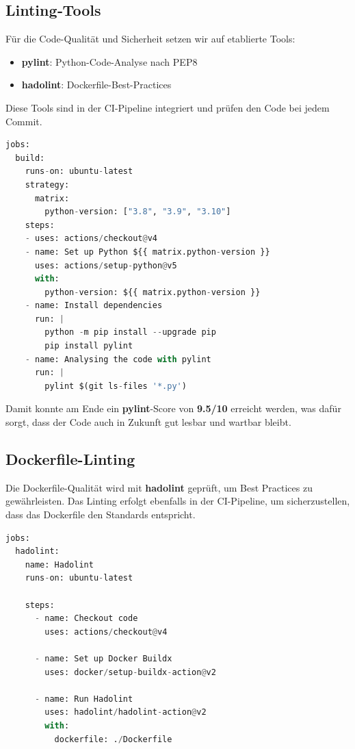 \documentclass{article}
\begin{document}
\newpage

\subsection{Linting‐Tools}

Für die Code-Qualität und Sicherheit setzen wir auf etablierte Tools:

\begin{itemize}
  \item \textbf{pylint}: Python-Code-Analyse nach PEP8
  \item \textbf{hadolint}: Dockerfile-Best-Practices
\end{itemize}

Diese Tools sind in der CI-Pipeline integriert und prüfen den Code bei jedem Commit. 

\begin{lstlisting}[language=python,caption={pylint.yml}]
jobs:
  build:
    runs-on: ubuntu-latest
    strategy:
      matrix:
        python-version: ["3.8", "3.9", "3.10"]
    steps:
    - uses: actions/checkout@v4
    - name: Set up Python ${{ matrix.python-version }}
      uses: actions/setup-python@v5
      with:
        python-version: ${{ matrix.python-version }}
    - name: Install dependencies
      run: |
        python -m pip install --upgrade pip
        pip install pylint
    - name: Analysing the code with pylint
      run: |
        pylint $(git ls-files '*.py')
\end{lstlisting}

\noindent
Damit konnte am Ende ein \textbf{pylint}-Score von \textbf{9.5/10} erreicht werden, was dafür sorgt, dass der Code auch in Zukunft gut lesbar und wartbar bleibt.

\subsection{Dockerfile-Linting}
\noindent
Die Dockerfile-Qualität wird mit \textbf{hadolint} geprüft, um Best Practices zu gewährleisten.
Das Linting erfolgt ebenfalls in der CI-Pipeline, um sicherzustellen, dass das Dockerfile den Standards entspricht.

\begin{lstlisting}[language=python,caption={hadolint.yml}]
jobs:
  hadolint:
    name: Hadolint
    runs-on: ubuntu-latest

    steps:
      - name: Checkout code
        uses: actions/checkout@v4

      - name: Set up Docker Buildx
        uses: docker/setup-buildx-action@v2

      - name: Run Hadolint
        uses: hadolint/hadolint-action@v2
        with:
          dockerfile: ./Dockerfile
\end{lstlisting}
\end{document}
